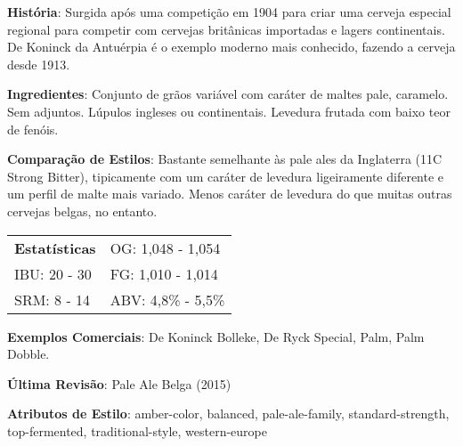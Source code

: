 \textbf{História}: Surgida após uma competição em 1904 para criar uma cerveja especial regional para competir com cervejas britânicas importadas e lagers continentais. De Koninck da Antuérpia é o exemplo moderno mais conhecido, fazendo a cerveja desde 1913.

\textbf{Ingredientes}: Conjunto de grãos variável com caráter de maltes pale, caramelo. Sem adjuntos. Lúpulos ingleses ou continentais. Levedura frutada com baixo teor de fenóis.

\textbf{Comparação de Estilos}: Bastante semelhante às pale ales da Inglaterra (11C Strong Bitter), tipicamente com um caráter de levedura ligeiramente diferente e um perfil de malte mais variado. Menos caráter de levedura do que muitas outras cervejas belgas, no entanto.

\begin{tabular}{@{}p{35mm}p{35mm}@{}}
  \textbf{Estatísticas} & OG: 1,048 - 1,054 \\
  IBU: 20 - 30  & FG: 1,010 - 1,014  \\
  SRM: 8 - 14  & ABV: 4,8\% - 5,5\%
\end{tabular}

\textbf{Exemplos Comerciais}: De Koninck Bolleke, De Ryck Special, Palm, Palm Dobble.

\textbf{Última Revisão}: Pale Ale Belga (2015)

\textbf{Atributos de Estilo}: amber-color, balanced, pale-ale-family, standard-strength, top-fermented, traditional-style, western-europe